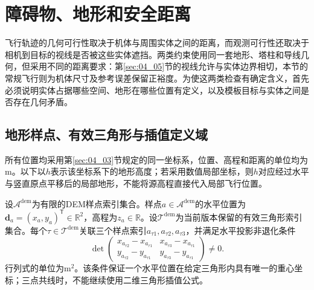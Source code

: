 \section{障碍物、地形和安全距离}
\label{sec:04_06}

飞行轨迹的几何可行性取决于机体与周围实体之间的距离，而观测可行性还取决于相机到目标的视线是否被这些实体遮挡。两类约束使用同一套地形、塔柱和导线几何，但采用不同的距离要求：第\ref{sec:04_05}节的视线允许与实体边界相切，本节的常规飞行则为机体尺寸及参考误差保留正裕度。为使这两类检查有确定含义，首先必须说明实体占据哪些空间、地形在哪些位置有定义，以及模板目标与实体之间是否存在几何矛盾。

\subsection{地形样点、有效三角形与插值定义域}

所有位置均采用第\ref{sec:04_03}节规定的同一坐标系，位置、高程和距离的单位均为$\mathrm m$。以下以$h$表示该坐标系下的地形高度；若采用数值局部坐标，则$h$对应经过水平与竖直原点平移后的局部地形，不能将源高程直接代入局部飞行位置。

设$\mathcal A^{\mathrm{dem}}$为有限的DEM样点索引集合。样点$a\in\mathcal A^{\mathrm{dem}}$的水平位置为$\mathbf d_a=(x_a,y_a)^{\mathsf T}\in\mathbb R^2$，高程为$z_a\in\mathbb R$。设$\mathcal T^{\mathrm{dem}}$为当前版本保留的有效三角形索引集合。每个$\tau\in\mathcal T^{\mathrm{dem}}$关联三个样点索引$a_{\tau1},a_{\tau2},a_{\tau3}$，并满足水平投影非退化条件
\begin{equation}
 \det\begin{pmatrix}
 x_{a_{\tau2}}-x_{a_{\tau1}}&x_{a_{\tau3}}-x_{a_{\tau1}}\\
 y_{a_{\tau2}}-y_{a_{\tau1}}&y_{a_{\tau3}}-y_{a_{\tau1}}
 \end{pmatrix}\ne0.
 \label{s0406:triangle_nondegeneracy}
\end{equation}
行列式的单位为$\mathrm{m^2}$。该条件保证一个水平位置在给定三角形内具有唯一的重心坐标；三点共线时，不能继续使用二维三角形插值公式。

